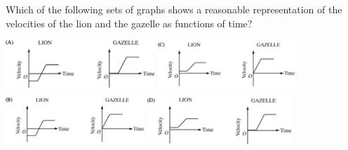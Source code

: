 \documentclass[10pt]{examdesign}
\begin{document}
\begin{multiplechoice} [title={Multiple Choice},
	rearrange=no]
\begin{question}
 Which of the following sets of graphs shows a reasonable representation of the velocities of the lion and the gazelle as functions of time? 
 
	\includegraphics[height=0.75in]{lga.png} \hspace{1in} \includegraphics[height=0.75in]{lgc.png} \\	
	\includegraphics[height=0.75in]{lgb.png} \hspace{1in} \includegraphics[height=0.75in]{lgd.png}

\end{question}








\end{multiplechoice}
\end{document}

